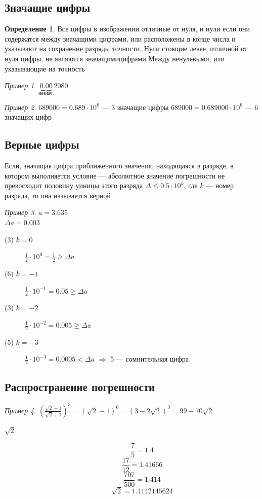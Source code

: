 \documentclass[oneside]{book}
\theoremstyle{plain}
\theoremstyle{remark}
\newtheorem*{examp}{Пример}
\theoremstyle{definition}
\newtheorem*{definition}{Определение}
\begin{document}
\subsection{Значащие цифры}
\label{sec:orge29b75f}
\begin{definition}
Все цифры в изображении отличные от нуля, и нули если они содержатся
между значащими цифрами, или расположены в конце числа и указывают на
сохранение разряды точности.  Нули стоящие левее, отличной от нуля
цифры, не являются значащимицифрами Между ненулевыми, или указывающие
на точность
\end{definition}

\begin{examp}
\(\underbrace{0.00}_\text{незнач.}2080\)
\end{examp}
\begin{examp}
\(689000 = 0.689 \cdot 10^6\) --- 3 значащие цифры
\(689000 = 0.689000 \cdot 10^6\) --- 6 значащих цифр
\end{examp}

\subsection{Верные цифры}
\label{sec:orgb3a390c}
\begin{defintion}
Если, значащая цифра приближенного значения, находящаяся в разряде, в
котором выполняется условие --- абсолютное значение погрешности не
превосходит половину уиницы этого разряда \(\Delta \le 0.5\cdot 10^k\),
где \(k\) --- номер разряда, то она называется верной
\end{defintion}

\begin{examp}
\(a = 3.635\) \\
\(\Delta a = 0.003\) \\
\begin{description}
\item[{(3) \(k = 0\)}] \(\frac{1}{2} \cdot 10^0 = \frac{1}{2} \ge \Delta a\)
\item[{(6) \(k = -1\)}] \(\frac{1}{2} \cdot 10^{-1} = 0.05 \ge \Delta a\)
\item[{(3) \(k = -2\)}] \(\frac{1}{2} \cdot 10^{-2} = 0.005 \ge \Delta a\)
\item[{(5) \(k = -3\)}] \(\frac{1}{2} \cdot 10^{-3} = 0.0005 < \Delta a\) \(\Rightarrow\) 5 --- сомнительная цифра
\end{description}
\end{examp}

\subsection{Распространение погрешности}
\label{sec:org432217d}
\begin{examp}
\(\left(\frac{\sqrt{2} - 1}{\sqrt{2} + 1}\right)^3 = (\sqrt{2} - 1)^6 = (3 - 2\sqrt{2})^3 = 99 - 70\sqrt{2}\) \\
\begin{description}
\item[{\(\sqrt{2}\)}] \[ \frac{7}{5} = 1.4 \]
\[ \frac{17}{12} = 1.41666 \]
\[ \frac{707}{500} = 1.414 \]
\[ \sqrt{2} = 1.4142145624 \]
\end{description}
\end{examp}
\end{document}
